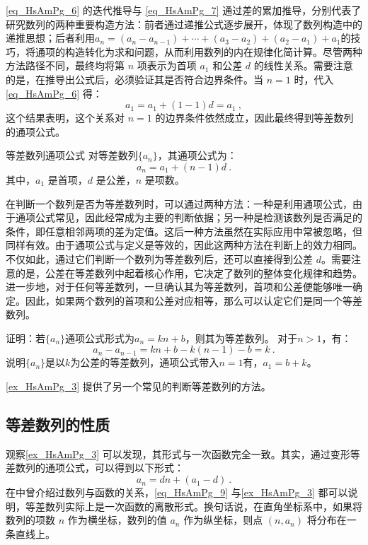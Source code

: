 \autoref{eq_HsAmPg_6} 的迭代推导与 \autoref{eq_HsAmPg_7} 通过差的累加推导，分别代表了研究数列的两种重要构造方法：前者通过递推公式逐步展开，体现了数列构造中的递推思想；后者利用$a_n=(a_n-a_{n-1})+ \cdots+(a_3 - a_2) +(a_2 - a_1)  + a_1$的技巧，将通项的构造转化为求和问题，从而利用数列的内在规律化简计算。尽管两种方法路径不同，最终均将第 $n$ 项表示为首项 $a_1$ 和公差 $d$ 的线性关系。需要注意的是，在推导出公式后，必须验证其是否符合边界条件。当  $n = 1$  时，代入\autoref{eq_HsAmPg_6} 得：
\begin{equation}
a_1 = a_1 + (1 - 1)d = a_1~,
\end{equation}
这个结果表明，这个关系对 $n = 1$ 的边界条件依然成立，因此最终得到等差数列的通项公式。
\begin{corollary}{等差数列通项公式}
对等差数列$\{a_n\}$，其通项公式为：
\begin{equation}\label{eq_HsAmPg_5}
a_n = a_1 + (n - 1)d~.
\end{equation}
其中，$a_1$ 是首项，$d$ 是公差，$n$ 是项数。
\end{corollary}

在判断一个数列是否为等差数列时，可以通过两种方法：一种是利用通项公式，由于通项公式常见，因此经常成为主要的判断依据；另一种是检测该数列是否满足的条件，即任意相邻两项的差为定值。这后一种方法虽然在实际应用中常被忽略，但同样有效。由于通项公式与定义是等效的，因此这两种方法在判断上的效力相同。不仅如此，通过它们判断一个数列为等差数列后，还可以直接得到公差 $d$。需要注意的是，公差在等差数列中起着核心作用，它决定了数列的整体变化规律和趋势。进一步地，对于任何等差数列，一旦确认其为等差数列，首项和公差便能够唯一确定。因此，如果两个数列的首项和公差对应相等，那么可以认定它们是同一个等差数列。

\begin{example}{证明：若$\{a_n\}$通项公式形式为$a_n=kn+b$，则其为等差数列。}\label{ex_HsAmPg_3}
对于$n>1$，有：
\begin{equation}
a_n-a_{n-1}=kn+b-k(n-1)-b=k~.
\end{equation}
说明$\{a_n\}$是以$k$为公差的等差数列，通项公式带入$n=1$有，$a_1=b+k$。
\end{example}

\autoref{ex_HsAmPg_3} 提供了另一个常见的判断等差数列的方法。

\subsection{等差数列的性质}

观察\autoref{ex_HsAmPg_3} 可以发现，其形式与一次函数完全一致。其实，通过变形等差数列的通项公式，可以得到以下形式：
\begin{equation}\label{eq_HsAmPg_9}
a_n=dn+(a_1-d)~.
\end{equation}
在中曾介绍过数列与函数的关系，\autoref{eq_HsAmPg_9} 与\autoref{ex_HsAmPg_3} 都可以说明，等差数列实际上是一次函数的离散形式。换句话说，在直角坐标系中，如果将数列的项数 $n$ 作为横坐标，数列的值 $a_n$ 作为纵坐标，则点 $(n, a_n)$ 将分布在一条直线上。

